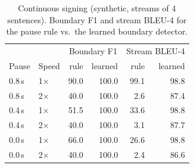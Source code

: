 \begin{table}[h]\centering\small
\begin{tabular}{llrrrr}\toprule
& & \multicolumn{2}{c}{Boundary F1} & \multicolumn{2}{c}{Stream BLEU-4} \\
Pause & Speed & rule & learned & rule & learned \\ \midrule
0.8\,s & 1$\times$ & 90.0 & 100.0 & 99.1 & 98.8 \\
0.8\,s & 2$\times$ & 40.0 & 100.0 & 2.6 & 87.4 \\
0.4\,s & 1$\times$ & 51.5 & 100.0 & 33.6 & 98.8 \\
0.4\,s & 2$\times$ & 40.0 & 100.0 & 3.1 & 87.7 \\
0.0\,s & 1$\times$ & 66.0 & 100.0 & 26.6 & 98.8 \\
0.0\,s & 2$\times$ & 40.0 & 100.0 & 2.4 & 86.6 \\
\bottomrule\end{tabular}
\caption{Continuous signing (synthetic, streams of 4 sentences). Boundary F1 and stream BLEU-4 for the pause rule vs.\ the learned boundary detector.}
\label{tab:synthetic-stream}\end{table}
